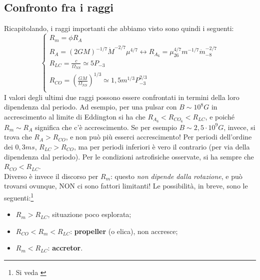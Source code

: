 \subsection{Confronto fra i raggi}
Ricapitolando, i raggi importanti che abbiamo visto sono quindi i seguenti:
\begin{equation}
\left\{
    \begin{array}{l}
       R_m =   \phi R_A  \\
       R_A = (2GM)^{-1/7}\dot{M}^{-2/7}\mu^{4/7} \longleftrightarrow R_{A_6} = \mu^{4/7}_{26}m^{-1/7}\dot{m}_{-8}^{-2/7}  \\
        R_{LC} =  \frac{c}{\Omega_{NS}} \simeq 5P_{-3}  \\
        R_{CO} =  \left( \frac{GM}{\Omega_{NS}} \right)^{1/3}\simeq 1,5m^{1/3}P_{-3}^{2/3}   \\
    \end{array}
\right.
\label{eq: raggi importanti in unità confrontabili}
\end{equation}
I valori degli ultimi due raggi possono essere confrontati in termini della loro dipendenza dal periodo. 
Ad esempio, per una pulsar con $B\sim10^{8}G$ in accrescimento al limite di Eddington si ha che $R_{A_6} < R_{CO_6} < R_{LC} $, e poiché $R_m\sim R_A$ significa che c'è accrescimento.
Se per esempio $B\sim2,5 \cdot 10^9G$, invece, si trova che $R_A>R_{CO}$, e non può più esserci accrescimento!
Per periodi dell'ordine dei $0,3ms$, $R_{LC}>R_{CO}$, ma per periodi inferiori è vero il contrario (per via della dipendenza dal periodo).
Per le condizioni astrofisiche osservate, si ha sempre che $R_{CO} < R_{LC} $.\vspace{2mm}\\
Diverso è invece il discorso per $R_m$: questo \textit{non dipende dalla rotazione}, e può trovarsi ovunque, NON ci sono fattori limitanti!
Le possibilità, in breve, sono le seguenti:\footnote{Si veda \cite{Burderi_2001}}
\begin{itemize}
    \item $R_m > R_{LC} $, situazione poco esplorata;
    \item $ R_{CO} < R_m < R_{LC} $: \textbf{propeller} (o elica), non accresce;
    \item $ R_m < R_{LC} $: \textbf{accretor}.
\end{itemize}


